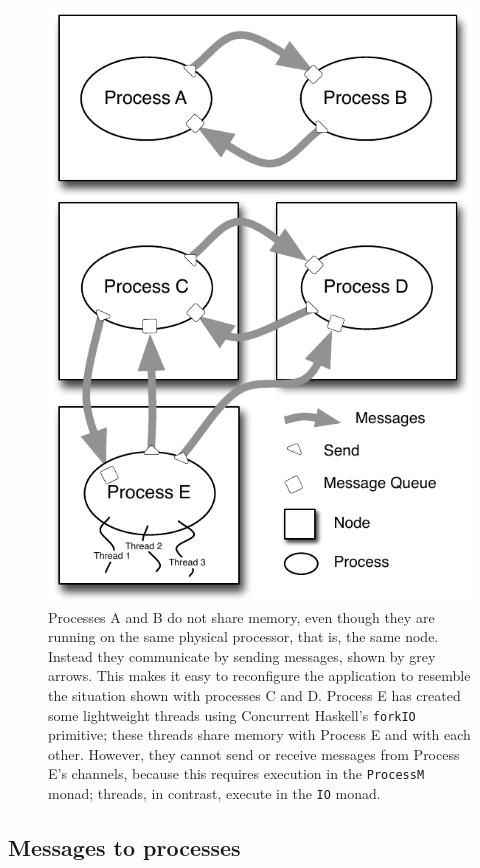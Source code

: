 \documentclass[preprint]{sigplanconf}
\begin{document}
\begin{figure}[t]
\centerline {
\includegraphics[width=0.95\columnwidth]{threadsAndProcesses}
}
\caption{ 
\label{fig:ProcessBubbles}
Processes A and B do not share memory, even though they are running on the same physical processor, that is, the same node. Instead they communicate by sending messages, shown by grey arrows.  This makes it easy to reconfigure the application to resemble the situation shown with processes C and D.  Process E has created some lightweight threads using Concurrent Haskell's \texttt{forkIO} primitive; these threads share memory with Process E and with each other.  However, they cannot send or receive messages from Process E's channels, because this requires execution in the \texttt{ProcessM} monad; threads, in contrast, execute in the \texttt{IO} monad.
}
\end{figure}


\subsection{Messages to processes}
\label{s:sendAndExpect}
\end{document}

